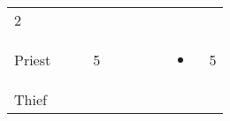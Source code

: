 \documentclass[12pt]{article}
\begin{document}
\begin{longtable}[]{@{}llllllllll@{}}
\begin{minipage}[t]{0.08\columnwidth}\raggedright\strut
2
\strut\end{minipage}\tabularnewline
\begin{minipage}[t]{0.13\columnwidth}\raggedright\strut
Priest
\strut\end{minipage} &
\begin{minipage}[t]{0.06\columnwidth}\raggedright\strut
\strut\end{minipage} &
\begin{minipage}[t]{0.06\columnwidth}\raggedright\strut
\strut\end{minipage} &
\begin{minipage}[t]{0.06\columnwidth}\raggedright\strut
5
\strut\end{minipage} &
\begin{minipage}[t]{0.06\columnwidth}\raggedright\strut
\strut\end{minipage} &
\begin{minipage}[t]{0.06\columnwidth}\raggedright\strut
\strut\end{minipage} &
\begin{minipage}[t]{0.06\columnwidth}\raggedright\strut
\strut\end{minipage} &
\begin{minipage}[t]{0.06\columnwidth}\raggedright\strut
\strut\end{minipage} &
\begin{minipage}[t]{0.07\columnwidth}\raggedright\strut
\begin{itemize}
\item
\end{itemize}
\strut\end{minipage} &
\begin{minipage}[t]{0.08\columnwidth}\raggedright\strut
5
\strut\end{minipage}\tabularnewline
\begin{minipage}[t]{0.13\columnwidth}\raggedright\strut
Thief
\strut\end{minipage} &
\begin{minipage}[t]{0.06\columnwidth}\raggedright\strut
\strut\end{minipage} &
\begin{minipage}[t]{0.06\columnwidth}\raggedright\strut
\strut\end{minipage} &
\begin{minipage}[t]{0.06\columnwidth}\raggedright\strut
\strut\end{minipage} &
\begin{minipage}[t]{0.06\columnwidth}\raggedright\strut

\end{minipage}
\end{longtable}
\end{document}
